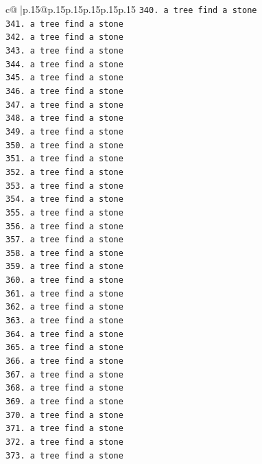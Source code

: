 \documentclass{article}
\begin{document}
{\begin{supertabular}{c@{$\;$}|p{.15\linewidth}@{}p{.15\linewidth}p{.15\linewidth}p{.15\linewidth}p{.15\linewidth}p{.15\linewidth}}
{{{\texttt{340. a tree find a stone} \\
\texttt{341. a tree find a stone} \\
\texttt{342. a tree find a stone} \\
\texttt{343. a tree find a stone} \\
\texttt{344. a tree find a stone} \\
\texttt{345. a tree find a stone} \\
\texttt{346. a tree find a stone} \\
\texttt{347. a tree find a stone} \\
\texttt{348. a tree find a stone} \\
\texttt{349. a tree find a stone} \\
\texttt{350. a tree find a stone} \\
\texttt{351. a tree find a stone} \\
\texttt{352. a tree find a stone} \\
\texttt{353. a tree find a stone} \\
\texttt{354. a tree find a stone} \\
\texttt{355. a tree find a stone} \\
\texttt{356. a tree find a stone} \\
\texttt{357. a tree find a stone} \\
\texttt{358. a tree find a stone} \\
\texttt{359. a tree find a stone} \\
\texttt{360. a tree find a stone} \\
\texttt{361. a tree find a stone} \\
\texttt{362. a tree find a stone} \\
\texttt{363. a tree find a stone} \\
\texttt{364. a tree find a stone} \\
\texttt{365. a tree find a stone} \\
\texttt{366. a tree find a stone} \\
\texttt{367. a tree find a stone} \\
\texttt{368. a tree find a stone} \\
\texttt{369. a tree find a stone} \\
\texttt{370. a tree find a stone} \\
\texttt{371. a tree find a stone} \\
\texttt{372. a tree find a stone} \\
\texttt{373. a tree find a stone} \\
}}}
\end{supertabular}}
\end{document}
